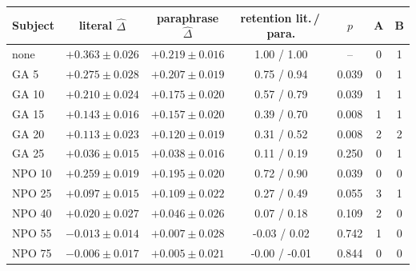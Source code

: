 \begin{tabular}{lcccccc}
\toprule
Subject & literal $\hat\Delta$ & paraphrase $\hat\Delta$ & retention lit.\,/\,para. & $p$ & A & B \\
\midrule
none & $+0.363\pm0.026$ & $+0.219\pm0.016$ & 1.00 / 1.00 & -- & 0 & 1 \\
GA 5 & $+0.275\pm0.028$ & $+0.207\pm0.019$ & 0.75 / 0.94 & 0.039 & 0 & 1 \\
GA 10 & $+0.210\pm0.024$ & $+0.175\pm0.020$ & 0.57 / 0.79 & 0.039 & 1 & 1 \\
GA 15 & $+0.143\pm0.016$ & $+0.157\pm0.020$ & 0.39 / 0.70 & 0.008 & 1 & 1 \\
GA 20 & $+0.113\pm0.023$ & $+0.120\pm0.019$ & 0.31 / 0.52 & 0.008 & 2 & 2 \\
GA 25 & $+0.036\pm0.015$ & $+0.038\pm0.016$ & 0.11 / 0.19 & 0.250 & 0 & 1 \\
NPO 10 & $+0.259\pm0.019$ & $+0.195\pm0.020$ & 0.72 / 0.90 & 0.039 & 0 & 0 \\
NPO 25 & $+0.097\pm0.015$ & $+0.109\pm0.022$ & 0.27 / 0.49 & 0.055 & 3 & 1 \\
NPO 40 & $+0.020\pm0.027$ & $+0.046\pm0.026$ & 0.07 / 0.18 & 0.109 & 2 & 0 \\
NPO 55 & $-0.013\pm0.014$ & $+0.007\pm0.028$ & -0.03 / 0.02 & 0.742 & 1 & 0 \\
NPO 75 & $-0.006\pm0.017$ & $+0.005\pm0.021$ & -0.00 / -0.01 & 0.844 & 0 & 0 \\
\bottomrule
\end{tabular}
